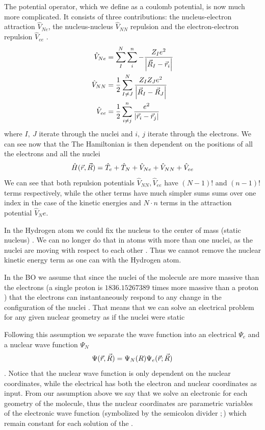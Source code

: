 \documentclass[../master_thesis.tex]{subfiles}
\begin{document}
The potential operator, which we define as a coulomb potential, is now much more
complicated. It consists of three contributions: the nucleus-electron attraction
$\hat{V}_{Ne}$, the nucleus-nucleus $\hat{V}_{NN}$ repulsion and the electron-electron
repulsion $\hat{V}_{ee}$ \cite{Cramer:2004}.
\begin{align}
  \hat{V}_{Ne} &= \sum^N_I\sum^n_{i}-\frac{Z_Ie^2}{\abs{\vec{R}_I - \vec{r}_i}}\\
  \hat{V}_{NN} &= \frac{1}{2}\sum^N_{I \neq J}\frac{Z_IZ_Je^2}{\abs{\vec{R}_I - \vec{R}_J}}\\
  \hat{V}_{ee} &= \frac{1}{2}\sum^n_{i \neq j} \frac{e^2}{\abs{\vec{r}_i - \vec{r}_j}}
\end{align}
where $I,\ J$ iterate through the nuclei and $i, \ j$ iterate through the electrons.
We can see now that the
The Hamiltonian is then dependent on the positions of all the electrons and all
the nuclei \cite{Jensen:2017}
\begin{equation}
  \hat{H}(\vec{r}, \vec{R}) = \hat{T}_e + \hat{T}_N + \hat{V}_{Ne} +\hat{V}_{NN} + \hat{V}_{ee}
\end{equation}
We can see that both repulsion potentials $\hat{V}_{NN}, \hat{V}_{ee}$ have $(N - 1)!$ and $(n - 1)!$ terms
 respectively, while the other terms have much simpler sums {sums over one index in the case of the
kinetic energies and $N\cdot n$ terms in the attraction potential $\hat{V}_Ne$}.

In the Hydrogen atom we could fix the nucleus to the center of mass (static nucleus)
\cite{Jensen:2017}. We can no longer do that in atoms with more than one nuclei, as
the nuclei are moving with respect to each other \cite{Cramer:2004}. Thus we cannot
remove the nuclear kinetic energy term as one can with the Hydrogen atom.

In the \ac{BO}  we assume that since the nuclei of the molecule are more massive
than the electrons (a single proton is $1836.152 673 89$ times more massive
than a proton \cite{NIST:2019}) that the electrons can instantaneously respond to
any change in the configuration of the nuclei \cite{Atkins:2011}. That means that we can solve an
electrical problem for any given nuclear geometry as if the nuclei were static
\cite{Cramer:2004, Jensen:2017, Atkins:2014}

Following this  assumption we separate the wave function into an electrical
$\Psi_e$ and a nuclear wave function $\Psi_N$
\begin{equation}
  \Psi(\vec{r}, \vec{R}) = \Psi_N(R)\Psi_e(\vec{r}; \vec{R})
\end{equation}.
Notice that the nuclear wave function is only dependent on the nuclear coordinates,
while the electrical has both the electron and nuclear coordinates as input. From
our assumption above we say that we solve an electronic \SE for each geometry
of the molecule, thus the nuclear coordinates  are parametric variables of
the electronic wave function (symbolized by the semicolon divider $;$) which remain
constant for each solution of the \SE.
\end{document}
